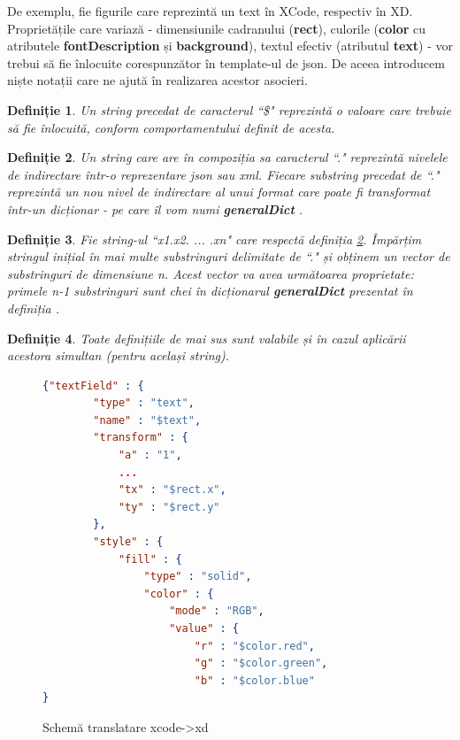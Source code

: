De exemplu, fie figurile  care reprezintă un text în XCode, respectiv în XD.
Proprietățile care variază - dimensiunile cadranului (\textbf{rect}), culorile (\textbf{color} cu atributele \textbf{fontDescription} și \textbf{background}), textul efectiv (atributul \textbf{text}) - vor trebui să fie înlocuite corespunzător în template-ul de json.
De aceea introducem niște notații care ne ajută în realizarea acestor asocieri. 


\newtheorem{mydef}{Definiție}[chapter]
\newtheorem{myNote}{Notă}[chapter]

\begin{mydef}\label{dollar}
Un string precedat de caracterul ``\$" reprezintă o valoare care trebuie să fie înlocuită, conform comportamentului definit de acesta.
\end{mydef}

\begin{mydef}\label{dot}
Un string care are în compoziția sa caracterul ``." reprezintă nivelele de indirectare într-o reprezentare json sau xml. Fiecare substring precedat de ``." reprezintă un nou nivel de indirectare al unui format care poate fi transformat într-un dicționar - pe care îl vom numi \textbf{generalDict} .
\end{mydef}

\begin{mydef}\label{count}
Fie string-ul ``x1.x2. ... .xn" care respectă definiția \ref{dot}. Împărțim stringul inițial în mai multe substringuri delimitate de ``." și obținem un vector de substringuri de dimensiune n. Acest vector va avea următoarea proprietate: primele n-1 substringuri sunt chei în dicționarul \textbf{generalDict} prezentat în definiția \label{dot}. 
\end{mydef}

\begin{mydef}
Toate definițiile de mai sus sunt valabile și în cazul aplicării acestora simultan (pentru același string).
\end{mydef}

\begin{figure}[!htbp]
\begin{lstlisting}[language=json,firstnumber=1]
{"textField" : {
        "type" : "text",
        "name" : "$text",
        "transform" : {
            "a" : "1",
            ...
            "tx" : "$rect.x",
            "ty" : "$rect.y"
        },
        "style" : {
            "fill" : {
                "type" : "solid",
                "color" : {
                    "mode" : "RGB",
                    "value" : {
                        "r" : "$color.red",
                        "g" : "$color.green",
                        "b" : "$color.blue"
}

\end{lstlisting}
\caption{Schemă translatare xcode->xd} \label{fig:XCode2XD Schema}
\end{figure}

